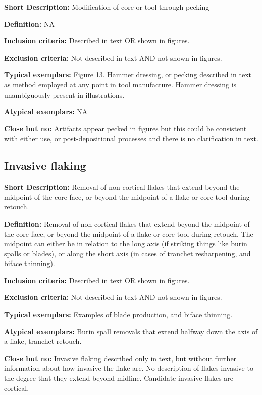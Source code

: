 \documentclass[
]{article}
\begin{document}
\textbf{Short Description:} Modification of core or tool through pecking

\textbf{Definition:} NA

\textbf{Inclusion criteria:} Described in text OR shown in figures.

\textbf{Exclusion criteria:} Not described in text AND not shown in
figures.

\textbf{Typical exemplars:} Figure 13. Hammer dressing, or pecking
described in text as method employed at any point in tool manufacture.
Hammer dressing is unambiguously present in illustrations.

\textbf{Atypical exemplars:} NA

\textbf{Close but no:} Artifacts appear pecked in figures but this could
be consistent with either use, or post-depositional processes and there
is no clarification in text.

\hypertarget{invasive-flaking}{%
\subsection{Invasive flaking}\label{invasive-flaking}}

\textbf{Short Description:} Removal of non-cortical flakes that extend
beyond the midpoint of the core face, or beyond the midpoint of a flake
or core-tool during retouch.

\textbf{Definition:} Removal of non-cortical flakes that extend beyond
the midpoint of the core face, or beyond the midpoint of a flake or
core-tool during retouch. The midpoint can either be in relation to the
long axis (if striking things like burin spalls or blades), or along the
short axis (in cases of tranchet resharpening, and biface thinning).

\textbf{Inclusion criteria:} Described in text OR shown in figures.

\textbf{Exclusion criteria:} Not described in text AND not shown in
figures.

\textbf{Typical exemplars:} Examples of blade production, and biface
thinning.

\textbf{Atypical exemplars:} Burin spall removals that extend halfway
down the axis of a flake, tranchet retouch.

\textbf{Close but no:} Invasive flaking described only in text, but
without further information about how invasive the flake are. No
description of flakes invasive to the degree that they extend beyond
midline. Candidate invasive flakes are cortical.
\end{document}
